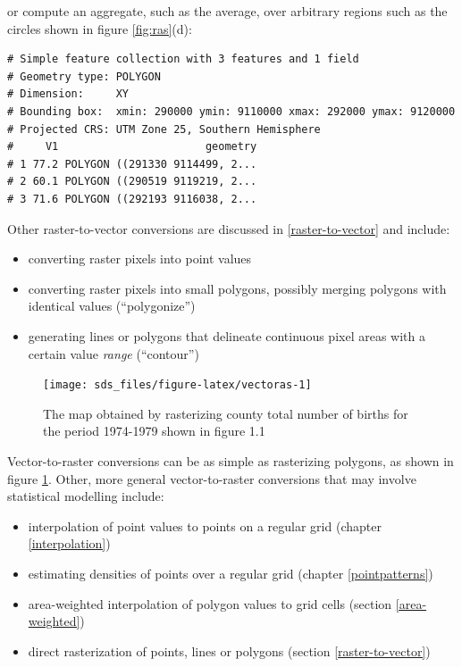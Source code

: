 \documentclass[]{book}
\providecommand{\tightlist}{%
  \setlength{\itemsep}{0pt}\setlength{\parskip}{0pt}}
\begin{document}
or compute an aggregate, such as the average, over arbitrary regions such as the circles shown in figure \ref{fig:ras}(d):

\begin{verbatim}
# Simple feature collection with 3 features and 1 field
# Geometry type: POLYGON
# Dimension:     XY
# Bounding box:  xmin: 290000 ymin: 9110000 xmax: 292000 ymax: 9120000
# Projected CRS: UTM Zone 25, Southern Hemisphere
#     V1                       geometry
# 1 77.2 POLYGON ((291330 9114499, 2...
# 2 60.1 POLYGON ((290519 9119219, 2...
# 3 71.6 POLYGON ((292193 9116038, 2...
\end{verbatim}

Other raster-to-vector conversions are discussed in \ref{raster-to-vector} and include:

\begin{itemize}
\tightlist
\item
  converting raster pixels into point values
\item
  converting raster pixels into small polygons, possibly merging polygons with identical values (``polygonize'')
\item
  generating lines or polygons that delineate continuous pixel areas with a certain value \emph{range} (``contour'')
\end{itemize}

\begin{figure}

{\centering \texttt{[image: sds\_files/figure-latex/vectoras-1]} 

}

\caption{The map obtained by rasterizing county total number of births for the period 1974-1979  shown in figure 1.1}\label{fig:vectoras}
\end{figure}

Vector-to-raster conversions can be as simple as rasterizing
polygons, as shown in figure \ref{fig:vectoras}. Other, more
general vector-to-raster conversions that may involve statistical
modelling include:

\begin{itemize}
\tightlist
\item
  interpolation of point values to points on a regular grid (chapter \ref{interpolation})
\item
  estimating densities of points over a regular grid (chapter \ref{pointpatterns})
\item
  area-weighted interpolation of polygon values to grid cells (section \ref{area-weighted})
\item
  direct rasterization of points, lines or polygons (section \ref{raster-to-vector})
\end{itemize}
\end{document}
